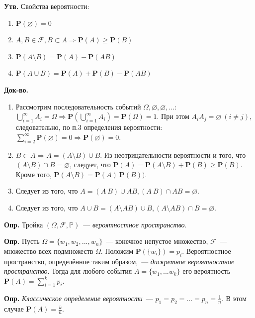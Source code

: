 \documentclass[oneside,final,14pt]{extreport}
\newcommand\mydef{{\bf Опр.}}
\newcommand\myst{{\bf Утв.}}
\newcommand\myqed{{\bf Док-во.}}
\newcommand\myprob[1]{{\mathbf{P}(#1)}}
\theoremstyle{definition}
\begin{document}
\myst{} Свойства вероятности:
\begin{enumerate}
    \item \( \myprob{\varnothing}=0 \)
    \item \( A, B \in \mathcal{F}, B \subset A \Rightarrow \myprob{A} \geqslant \myprob{B} \)
    \item \( \myprob{A \setminus B} = \myprob{A} - \myprob{AB} \)
    \item \( \myprob{A \cup B} = \myprob{A} + \myprob{B} - \myprob{AB} \)
\end{enumerate}

\myqed{}
\begin{enumerate}
    \item Рассмотрим последовательность событий \( \Omega, \varnothing, \varnothing, ...\): \( \bigcup\limits_{i=1}^\infty A_i = \Omega \Rightarrow \myprob{\bigcup\limits_{i=1}^\infty A_i} = \myprob{\Omega} = 1 \). При этом \( A_{i}A_j = \varnothing~(i \ne j) \), следовательно, по п.3 определения вероятности: \( \sum\limits_{i=2}^\infty \myprob{\varnothing} = 0 \Rightarrow \myprob{\varnothing} = 0 \).
    \item \( B \subset A \Rightarrow A = (A \setminus B) \cup B \). Из неотрицательности вероятности и того, что \( (A \setminus B) \cap B = \varnothing \), следует, что \( \myprob{A} = \myprob{A \setminus B} + \myprob{B} \geqslant \myprob{B} \). Кроме того, \( \myprob{A \setminus B} = \myprob{A} \ \myprob{B})\).
    \item Следует из того, что \( A = (A \ B) \cup AB, (A \ B) \cap AB = \varnothing \).
    \item Следует из того, что \( A \cup B = (A \setminus AB) \cup B, (A \setminus AB) \cap B = \varnothing \).
\end{enumerate}

\mydef{} Тройка \( (\Omega, \mathcal{F}, \mathbb{P}) \)~--- {\it вероятностное пространство}.

\mydef{} Пусть \( \Omega = \{ w_1, w_2,..., w_n\} \)~--- конечное непустое множество, \( \mathcal{F} \)~--- множество всех подмножеств \( \Omega \). Положим \( \myprob{\{w_i\}} = p_i \). Вероятностное пространство, определённое таким образом,~--- {\it дискретное вероятностное пространство}. Тогда для любого события \( A = \{ w_1,...w_k\} \) его вероятность \( \myprob{A} = \sum\limits_{i=1}^k p_i \).

\mydef{} {\it Классическое определение вероятности}~--- \(p_1 = p_2 =...=p_n=\frac{1}{n} \). В этом случае \( \myprob{A} = \frac{k}{n} \).
\end{document}
